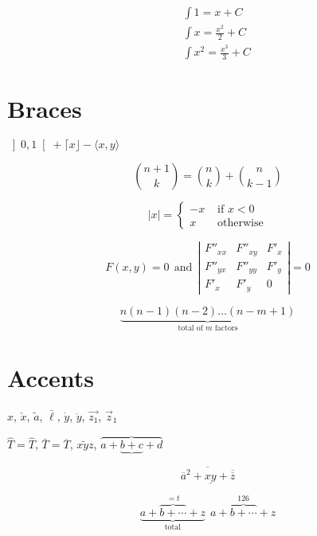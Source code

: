 \documentclass{article}
\begin{document}
\begin{eqnarray}
&& \int 1 = x + C \nonumber\\
&& \int x = \frac{x^2}{2} + C \nonumber\\
&& \int x^2 = \frac{x^3}{3} + C \label{eq:xdef}
\end{eqnarray}

\section{Braces}

$\left] 0,1
\right[
 + \lceil x \rfloor - \langle x,y\rangle$
 
$$
{n+1\choose k} = {n\choose k} + {n \choose k-1}
$$

$$
|x| = \left\{ \begin{array}{rl}
 -x &\mbox{ if $x<0$} \\
  x &\mbox{ otherwise}
       \end{array} \right.
$$

$$
F(x,y)=0 ~~\mbox{and}~~
\left| \begin{array}{ccc}
  F''_{xx} & F''_{xy} &  F'_x \\
  F''_{yx} & F''_{yy} &  F'_y \\
  F'_x     & F'_y     & 0 
  \end{array}\right| = 0
$$

$$
\underbrace{n(n-1)(n-2)\dots(n-m+1)}_{\mbox{total of $m$ factors}}
$$

\section{Accents}

$\hat{x}$, $\check{x}$, $\tilde{a}$, 
$\bar{\ell}$, $\dot{y}$, $\ddot{y}$, 
$\vec{z_1}$, $\vec{z}_1$

$\hat{T} = \widehat{T}$,
$\bar{T} = \overline{T}$, $\widetilde{xyz}$,
$\overbrace{a+\underbrace{b+c}+d}$

$$
 \overline{\overline{a}^2+\underline{xy}
 +\overline{\overline{z}}}
$$

$$
\underbrace{a+\overbrace{b+\cdots}^{{}=t}+z}
_{\mathrm{total}} ~~
a+{\overbrace{b+\cdots}}^{126}+z
$$
\end{document}
